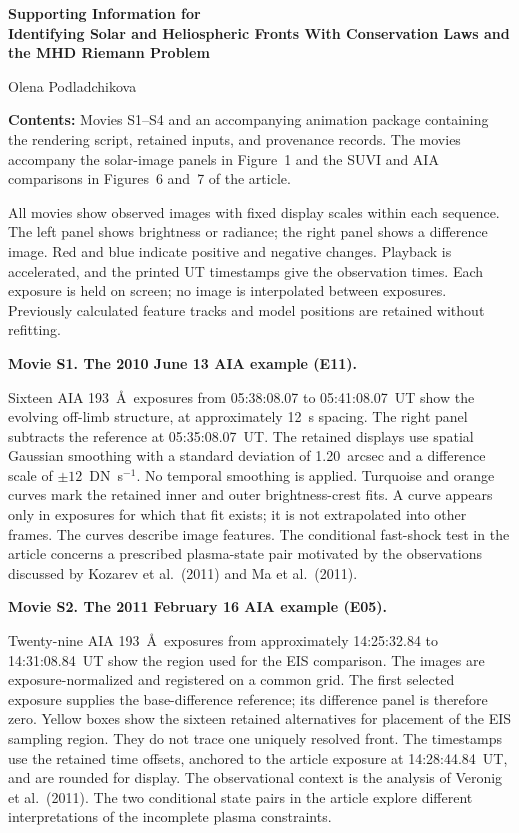 \documentclass[11pt,letterpaper]{article}
\begin{document}
\begin{center}
{\large\bfseries Supporting Information for\\[5pt]
Identifying Solar and Heliospheric Fronts With Conservation Laws and the MHD Riemann Problem}\par
\vspace{5pt}
Olena Podladchikova
\end{center}

\textbf{Contents:} Movies S1--S4 and an accompanying animation package
containing the rendering script, retained inputs, and provenance records.
The movies accompany the solar-image panels in Figure~1 and the SUVI and
AIA comparisons in Figures~6 and~7 of the article.

All movies show observed images with fixed display scales within each
sequence. The left panel shows brightness or radiance; the right panel
shows a difference image. Red and blue indicate positive and negative
changes. Playback is accelerated, and the printed UT timestamps give
the observation times. Each exposure is held on screen; no image is
interpolated between exposures. Previously calculated feature tracks
and model positions are retained without refitting.

\textbf{Movie S1. The 2010 June 13 AIA example (E11).}

Sixteen AIA 193~\AA\ exposures from 05:38:08.07 to 05:41:08.07~UT
show the evolving off-limb structure, at approximately 12~s spacing.
The right panel subtracts the reference at 05:35:08.07~UT.
The retained displays use spatial Gaussian smoothing with a standard
deviation of 1.20~arcsec and a difference scale of $\pm12$~DN~s$^{-1}$.
No temporal smoothing is applied.
Turquoise and orange curves mark the retained inner and outer
brightness-crest fits. A curve appears only in exposures for which
that fit exists; it is not extrapolated into other frames.
The curves describe image features. The conditional fast-shock test
in the article concerns a prescribed plasma-state pair motivated by
the observations discussed by Kozarev et al.\ (2011) and Ma et al.\ (2011).

\textbf{Movie S2. The 2011 February 16 AIA example (E05).}

Twenty-nine AIA 193~\AA\ exposures from approximately 14:25:32.84
to 14:31:08.84~UT show the region used for the EIS comparison.
The images are exposure-normalized and registered on a common grid.
The first selected exposure supplies the base-difference reference;
its difference panel is therefore zero. Yellow boxes show the sixteen
retained alternatives for placement of the EIS sampling region.
They do not trace one uniquely resolved front. The timestamps use
the retained time offsets, anchored to the article exposure at
14:28:44.84~UT, and are rounded for display. The observational context
is the analysis of Veronig et al.\ (2011). The two conditional state
pairs in the article explore different interpretations of the
incomplete plasma constraints.
\end{document}
